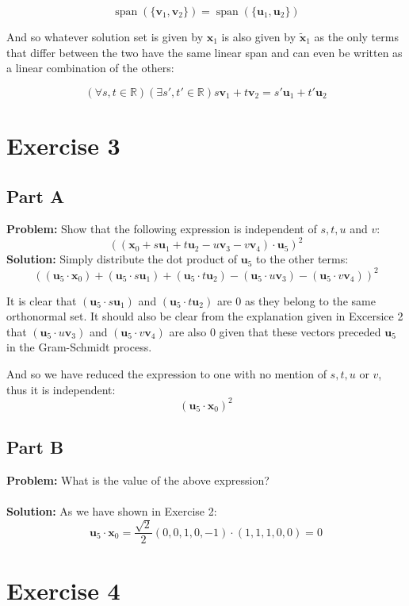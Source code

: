 \documentclass{article}
\begin{document}
$$\operatorname{span}(\{\mathbf v_1,\mathbf v_2\})=\operatorname{span}(\{\mathbf u_1,\mathbf u_2\})$$

And so whatever solution set is given by $\mathbf x_1$ is also given by $\tilde{\mathbf x}_1$ as the only terms that differ between the two have the same linear span and can even be written as a linear combination of the others:

$$\left(\forall s,t\in\mathbb R\right)\left(\exists s',t'\in\mathbb R\right)s\mathbf v_1+t\mathbf v_2=s'\mathbf u_1+t'\mathbf u_2$$

\section*{Exercise 3}
\subsection*{Part A}
\textbf{Problem:} Show that the following expression is independent of $s,t,u$ and $v$:
$$((\mathbf x_0+s\mathbf u_1+t\mathbf u_2-u\mathbf v_3-v\mathbf v_4)\cdot\mathbf u_5)^2$$
\textbf{Solution:} Simply distribute the dot product of $\mathbf u_5$ to the other terms:
$$((\mathbf u_5\cdot\mathbf x_0)+(\mathbf u_5\cdot s\mathbf u_1)+(\mathbf u_5\cdot t\mathbf u_2)-(\mathbf u_5\cdot u\mathbf v_3)-(\mathbf u_5\cdot v\mathbf v_4))^2$$

It is clear that $(\mathbf u_5\cdot s\mathbf u_1)$ and $(\mathbf u_5\cdot t\mathbf u_2)$ are 0 as they belong to the same orthonormal set. It should also be clear from the explanation given in Excersice 2 that $(\mathbf u_5\cdot u\mathbf v_3)$ and $(\mathbf u_5\cdot v\mathbf v_4)$ are also 0 given that these vectors preceded $\mathbf u_5$ in the Gram-Schmidt process.

And so we have reduced the expression to one with no mention of $s,t,u$ or $v$, thus it is independent:
$$(\mathbf u_5\cdot\mathbf x_0)^2$$

\subsection*{Part B}
\textbf{Problem:} What is the value of the above expression?
\\\\
\textbf{Solution:} As we have shown in Exercise 2:
$$\mathbf u_5\cdot\mathbf x_0=\frac{\sqrt 2}{2}(0,0,1,0,-1)\cdot(1,1,1,0,0)=0$$

\section*{Exercise 4}
\end{document}
